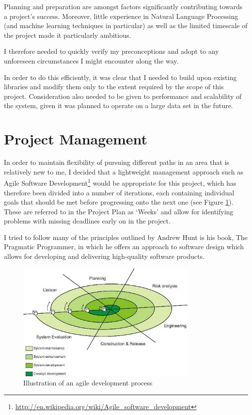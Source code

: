 Planning and preparation are amongst factors significantly contributing towards a project's success. Moreover, little experience in Natural Language Processing (and machine learning techniques in particular) as well as the limited timescale of the project made it particularly ambitious.

I therefore needed to quickly verify my preconceptions and adopt to any unforeseen circumstances I might encounter along the way.

In order to do this efficiently, it was clear that I needed to build upon existing libraries and modify them only to the extent required by the scope of this project. Consideration also needed to be given to performance and scalability of the system, given it was planned to operate on a large data set in the future.

\section{Project Management}

In order to maintain flexibility of pursuing different paths in an area that is relatively new to me, I decided that a lightweight management approach such as Agile Software Development\footnote{\url{http://en.wikipedia.org/wiki/Agile_software_development}} would be appropriate for this project, which has therefore been divided into a number of iterations, each containing individual goals that should be met before progressing onto the next one (see Figure \ref{fig:iterative}). These are referred to in the Project Plan as `Weeks' and allow for identifying problems with missing deadlines early on in the project.

I tried to follow many of the principles outlined by Andrew Hunt is his book, The Pragmatic Programmer\cite{PragProg}, in which he offers an approach to software design which allows for developing and delivering high-quality software products.

\begin{figure}[htb]
  \begin{center}
    \includegraphics[width=0.8\textwidth]{iterative.jpg}
    \caption{Illustration of an agile development process}
    \label{fig:iterative}
  \end{center}
\end{figure}

